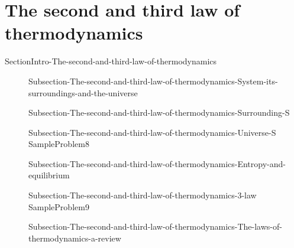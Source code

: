 \documentclass[main.tex]{subfiles}
\newcommand\chapterlabel{Ch-thermo}\setcounter{figurenewcounter}{0}\setcounter{tablenewcounter}{0}\setcounter{formulanewcounter}{0}
\begin{document}
\section{The second and third law of thermodynamics}{SectionIntro-The-second-and-third-law-of-thermodynamics}
\sloppy\begin{description}
\item[] {Subsection-The-second-and-third-law-of-thermodynamics-System-its-surroundings-and-the-universe}
\item[] {Subsection-The-second-and-third-law-of-thermodynamics-Surrounding-S}
\item[] {Subsection-The-second-and-third-law-of-thermodynamics-Universe-S}
{SampleProblem8}
 \item[] {Subsection-The-second-and-third-law-of-thermodynamics-Entropy-and-equilibrium}
\item[] {Subsection-The-second-and-third-law-of-thermodynamics-3-law}
{SampleProblem9}
 \item[] {Subsection-The-second-and-third-law-of-thermodynamics-The-laws-of-thermodynamics-a-review}
\end{description}
\end{document}
